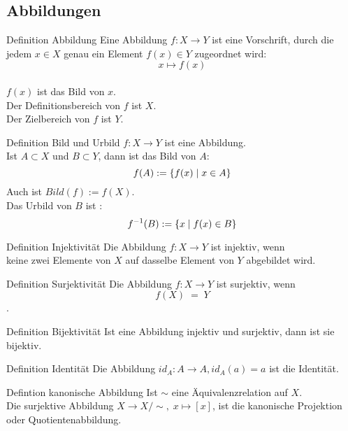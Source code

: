 \documentclass[a6paper,11pt,print,grid=front]{kartei}
\begin{document}
\subsection*{Abbildungen}
\begin{karte}{Definition Abbildung}
    Eine Abbildung \(f : X \rightarrow Y\) ist eine Vorschrift, 
    durch die jedem \(x \in X \) genau ein Element \(f(x) \in Y\)
    zugeordnet wird:  \\
    \[ x \mapsto f(x)\] \\
     \( f(x)\) ist das Bild von \(x\). \\
    Der Definitionsbereich von \(f\) ist \(X\). \\
    Der Zielbereich von \(f\) ist \(Y\). 
\end{karte}
\begin{karte}{Definition Bild und Urbild}
    \(f : X \rightarrow Y\) ist eine Abbildung. \\
    Ist \(A \subset X\) und \(B \subset Y\),
     dann ist das Bild von \(A\):
    \[f(A) := \{ f(x) \;\vert \; x \in A \}\]
    Auch ist \(Bild(f) := f(X)\). \\
    Das Urbild von \(B\) ist : 
    \[f^{-1}(B) := \{x \;\vert \; f(x) \in B\}\]
\end{karte}
\begin{karte}{Definition Injektivität}
Die Abbildung \(f: X \rightarrow Y\) ist injektiv, wenn \\
keine zwei Elemente von \(X\) auf dasselbe Element von \(Y\) abgebildet wird. 
\end{karte}
\begin{karte}{Definition Surjektivität}
    Die Abbildung \(f: X \rightarrow Y\) ist surjektiv, wenn \\
    \[ f(X) \; = \; Y\].
\end{karte} 
\begin{karte}{Definition Bijektivität}
    Ist eine Abbildung injektiv und surjektiv, dann ist sie bijektiv. 
\end{karte}
\begin{karte}{Definition Identität}
    Die Abbildung \(id_A : A \rightarrow A, id_A(a) = a\) ist die Identität.
\end{karte}
\begin{karte}{Defintion kanonische Abbildung}
    Ist \(\sim\) eine Äquivalenzrelation auf \(X\). \\
    Die surjektive Abbildung \(X \rightarrow X / \sim, \; x \mapsto [x]\), 
    ist die kanonische Projektion oder Quotientenabbildung. 
\end{karte}
\end{document}

